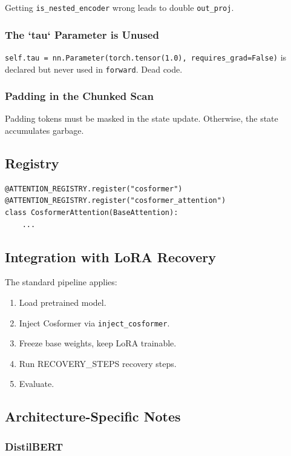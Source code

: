 Getting \texttt{is\_nested\_encoder} wrong leads to double \texttt{out\_proj}.

\subsubsection{The `tau` Parameter is Unused}

\texttt{self.tau = nn.Parameter(torch.tensor(1.0), requires\_grad=False)} is 
declared but never used in \texttt{forward}. Dead code.

\subsubsection{Padding in the Chunked Scan}

Padding tokens must be masked in the state update. Otherwise, the state 
accumulates garbage.

\subsection{Registry}

\begin{lstlisting}
@ATTENTION_REGISTRY.register("cosformer")
@ATTENTION_REGISTRY.register("cosformer_attention")
class CosformerAttention(BaseAttention):
    ...
\end{lstlisting}

\subsection{Integration with LoRA Recovery}

The standard pipeline applies:

\begin{enumerate}
\item Load pretrained model.
\item Inject Cosformer via \texttt{inject\_cosformer}.
\item Freeze base weights, keep LoRA trainable.
\item Run {{RECOVERY\_STEPS}} recovery steps.
\item Evaluate.

\end{enumerate}
\subsection{Architecture-Specific Notes}

\subsubsection{DistilBERT}

